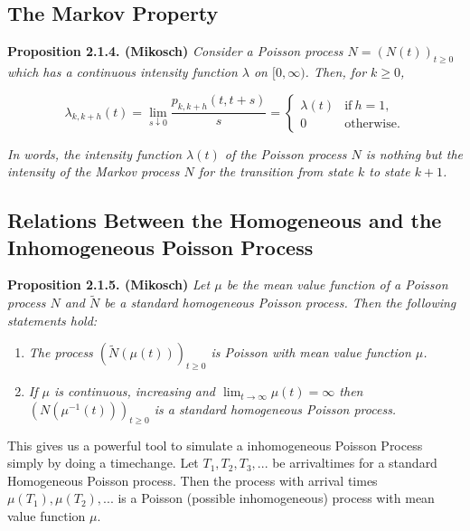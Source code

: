 \documentclass[a4paper,10pt,openany]{book}
\providecommand{\tightlist}{%
 \setlength{\itemsep}{0pt}\setlength{\parskip}{0pt}}
\begin{document}
\hypertarget{the-markov-property}{%
\subsection{The Markov Property}\label{the-markov-property}}

\textbf{Proposition 2.1.4. (Mikosch)} \emph{Consider a Poisson process \(N = (N(t))_{t\ge 0}\) which has a continuous intensity function \(\lambda\) on \([0, \infty)\). Then, for \(k \ge 0\),}

\[
\lambda_{k,k+h}(t)=\lim_{s\downarrow 0}\frac{p_{k,k+h}(t,t+s)}{s}=
\left\{\begin{array}{cc}
\lambda(t) & \text{if}\ h=1 ,\\
0 & \text{otherwise}.
\end{array}\right.
\]

\emph{In words, the intensity function \(\lambda(t)\) of the Poisson process \(N\) is nothing but the intensity of the Markov process \(N\) for the transition from state \(k\) to state \(k + 1\).}

\hypertarget{relations-between-the-homogeneous-and-the-inhomogeneous-poisson-process}{%
\subsection{Relations Between the Homogeneous and the Inhomogeneous Poisson Process}\label{relations-between-the-homogeneous-and-the-inhomogeneous-poisson-process}}

\textbf{Proposition 2.1.5. (Mikosch)} \emph{Let \(\mu\) be the mean value function of a Poisson process \(N\) and \(\tilde{N}\) be a standard homogeneous Poisson process. Then the following statements hold:}

\begin{enumerate}
\def\labelenumi{(\arabic{enumi})}
\tightlist
\item
  \emph{The process \((\tilde{N}(\mu(t)))_{t\ge 0}\) is Poisson with mean value function \(\mu\).}
\item
  \emph{If \(\mu\) is continuous, increasing and \(\lim_{t\to\infty}\mu(t)=\infty\) then \((N(\mu^{-1}(t)))_{t\ge 0}\) is a standard homogeneous Poisson process.}
\end{enumerate}

This gives us a powerful tool to simulate a inhomogeneous Poisson Process simply by doing a timechange. Let \(T_1,T_2,T_3,...\) be arrivaltimes for a standard Homogeneous Poisson process. Then the process with arrival times \(\mu(T_1),\mu(T_2),...\) is a Poisson (possible inhomogeneous) process with mean value function \(\mu\).
\end{document}
